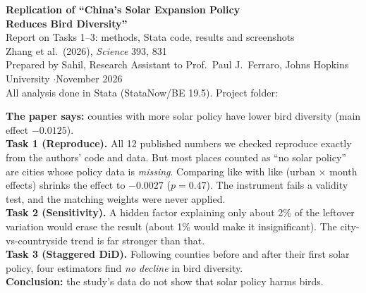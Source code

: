 \documentclass[11pt]{article}
\begin{document}
\begin{center}
{\LARGE\bfseries Replication of ``China's Solar Expansion Policy\\[2pt] Reduces Bird Diversity''}\\[6pt]
{\large Report on Tasks 1--3: methods, Stata code, results and screenshots}\\[6pt]
{\small Zhang et al.\ (2026), \textit{Science} 393, 831}\\[2pt]
{\small Prepared by Sahil, Research Assistant to Prof.\ Paul J.\ Ferraro, Johns Hopkins University \quad$\cdot$\quad November 2026}\\[2pt]
{\small All analysis done in Stata (StataNow/BE 19.5). Project folder: }
\end{center}

\begin{summarybox}
\small
\textbf{The paper says:} counties with more solar policy have lower bird diversity (main effect $-0.0125$).\\[3pt]
\textbf{Task 1 (Reproduce).} All 12 published numbers we checked reproduce exactly from the authors' code and data. But most places counted as ``no solar policy'' are cities whose policy data is \emph{missing}. Comparing like with like (urban $\times$ month effects) shrinks the effect to $-0.0027$ ($p=0.47$). The instrument fails a validity test, and the matching weights were never applied.\\[3pt]
\textbf{Task 2 (Sensitivity).} A hidden factor explaining only about 2\% of the leftover variation would erase the result (about 1\% would make it insignificant). The city-vs-countryside trend is far stronger than that.\\[3pt]
\textbf{Task 3 (Staggered DiD).} Following counties before and after their first solar policy, four estimators find \emph{no decline} in bird diversity.\\[3pt]
\textbf{Conclusion:} the study's data do not show that solar policy harms birds.
\end{summarybox}

\tableofcontents
\newpage

\end{document}

